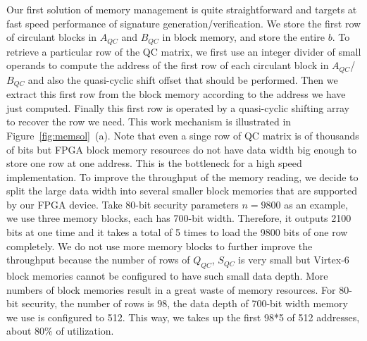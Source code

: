 \documentclass[10pt,journal,compsoc]{IEEEtran}
\begin{document}
Our first solution of memory management is quite straightforward and targets at fast speed performance of signature generation/verification. We store the first row of circulant blocks in $A_{QC}$ and $B_{QC}$ in block memory, and store the entire $b$. To retrieve a particular row of the QC matrix, we first use an integer divider of small operands to compute the address of the first row of each circulant block in $A_{QC}$/$B_{QC}$ and also the quasi-cyclic shift offset that should be performed. Then we extract this first row from the block memory according to the address we have just computed. Finally this first row is operated by a quasi-cyclic shifting array to recover the row we need. This work mechanism is illustrated in Figure~\ref{fig:memsol}~(a). Note that even a singe row of QC matrix is of thousands of bits but FPGA block memory resources do not have  data width big enough to store one row at one address.  This is the bottleneck for a high speed implementation. To improve the throughput of the memory reading,  we decide to split the large data width into several smaller block memories that are supported by our FPGA device. Take 80-bit security parameters $n=9800$ as an example,  we use three memory blocks, each has 700-bit width. Therefore, it outputs 2100 bits at one time and it takes a total of 5 times to load the 9800 bits of one row completely. We do not use more memory blocks to further improve the throughput because the number of rows of $Q_{QC}$, $S_{QC}$ is very small but Virtex-6 block memories cannot be configured to have such small data depth. More numbers of block memories result in a great waste of memory resources.  For 80-bit security, the number of rows is $98$,
the data depth of 700-bit width memory we use is configured to 512. This way, we takes up the first 98*5 of 512 addresses, about 80\% of utilization.
\end{document}
